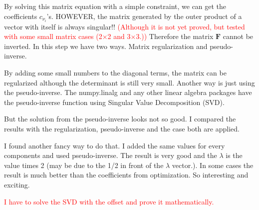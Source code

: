 \documentclass[11pt]{article}
\begin{document}
By solving this matrix equation with a simple constraint, we can get the coefficients $c_{\nu_i}$'s. HOWEVER, the matrix generated by the outer product of a vector with itself is always singular!! \textcolor{red}{(Although it is not yet proved, but tested with some small matrix cases (2$\times$2 and 3$\times$3.))} Therefore the matrix $\mathbf{F}$ cannot be inverted.
In this step we have two ways. Matrix regularization and pseudo-inverse.

By adding some small numbers to the diagonal terms, the matrix can be regularized although the determinant is still very small. 
Another way is just using the pseudo-inverse. The numpy.linalg and any other linear algebra packages have the pseudo-inverse function using Singular Value Decomposition (SVD).

But the solution from the pseudo-inverse looks not so good. I compared the results with the regularization,  pseudo-inverse and the case both are applied. 

I found another fancy way to do that. I added the same values for every components and used pseudo-inverse. The result is very good and the $\lambda$ is the value times 2 (may be due to the 1/2 in front of the $\lambda$ vector.). In some cases the result is much better than the coefficients from optimization. So interesting and exciting. 

\textcolor{red}{
I have to solve the SVD with the offset and prove it mathematically.}
\end{document}
